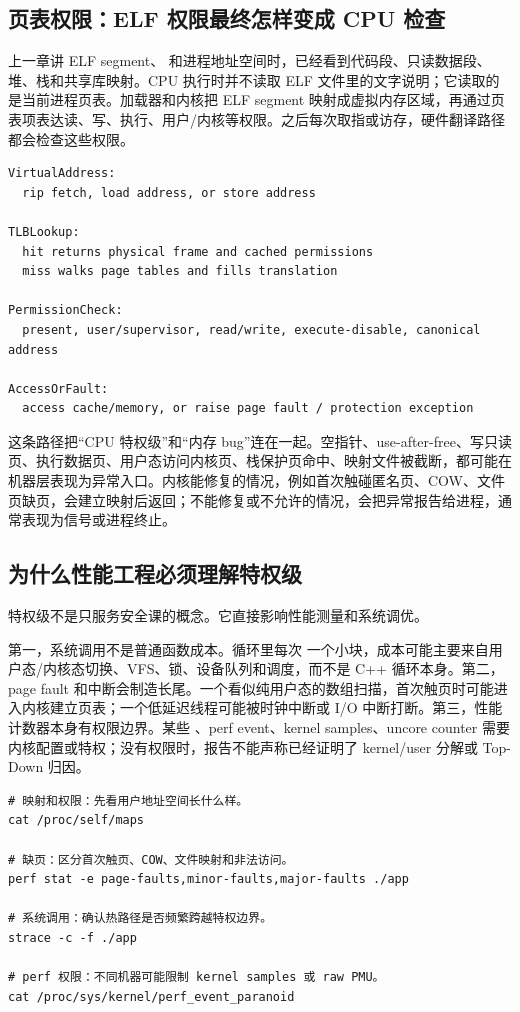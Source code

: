 \subsection{页表权限：ELF 权限最终怎样变成 CPU 检查}

上一章讲 ELF segment、 和进程地址空间时，已经看到代码段、只读数据段、堆、栈和共享库映射。CPU 执行时并不读取 ELF 文件里的文字说明；它读取的是当前进程页表。加载器和内核把 ELF segment 映射成虚拟内存区域，再通过页表项表达读、写、执行、用户/内核等权限。之后每次取指或访存，硬件翻译路径都会检查这些权限。

\begin{lstlisting}[numbers=none,caption={虚拟地址权限检查的压缩路径}]
VirtualAddress:
  rip fetch, load address, or store address

TLBLookup:
  hit returns physical frame and cached permissions
  miss walks page tables and fills translation

PermissionCheck:
  present, user/supervisor, read/write, execute-disable, canonical address

AccessOrFault:
  access cache/memory, or raise page fault / protection exception
\end{lstlisting}

这条路径把“CPU 特权级”和“内存 bug”连在一起。空指针、use-after-free、写只读页、执行数据页、用户态访问内核页、栈保护页命中、映射文件被截断，都可能在机器层表现为异常入口。内核能修复的情况，例如首次触碰匿名页、COW、文件页缺页，会建立映射后返回；不能修复或不允许的情况，会把异常报告给进程，通常表现为信号或进程终止。

\subsection{为什么性能工程必须理解特权级}

特权级不是只服务安全课的概念。它直接影响性能测量和系统调优。

第一，系统调用不是普通函数成本。循环里每次  一个小块，成本可能主要来自用户态/内核态切换、VFS、锁、设备队列和调度，而不是 C++ 循环本身。第二，page fault 和中断会制造长尾。一个看似纯用户态的数组扫描，首次触页时可能进入内核建立页表；一个低延迟线程可能被时钟中断或 I/O 中断打断。第三，性能计数器本身有权限边界。某些 、perf event、kernel samples、uncore counter 需要内核配置或特权；没有权限时，报告不能声称已经证明了 kernel/user 分解或 Top-Down 归因。

\begin{lstlisting}[numbers=none,caption={特权级相关的最小证据包}]
# 映射和权限：先看用户地址空间长什么样。
cat /proc/self/maps

# 缺页：区分首次触页、COW、文件映射和非法访问。
perf stat -e page-faults,minor-faults,major-faults ./app

# 系统调用：确认热路径是否频繁跨越特权边界。
strace -c -f ./app

# perf 权限：不同机器可能限制 kernel samples 或 raw PMU。
cat /proc/sys/kernel/perf_event_paranoid
\end{lstlisting}

